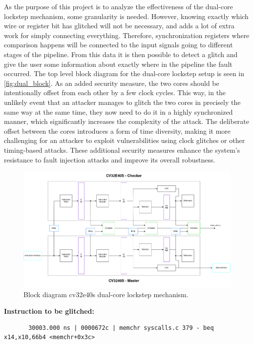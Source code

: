 As the purpose of this project is to analyze the effectiveness of the dual-core lockstep mechanism, some granularity is needed. However, knowing exactly which wire or register bit has glitched will not be necessary, and adds a lot of extra work for simply connecting everything. Therefore, synchronization registers where comparison happens will be connected to the input signals going to different stages of the pipeline. From this data it is then possible to detect a glitch and give the user some information about exactly where in the pipeline the fault occurred. The top level block diagram for the dual-core lockstep setup is seen in \autoref{fig:dual_block}. As an added security measure, the two cores should be intentionally offset from each other by a few clock cycles. This way, in the unlikely event that an attacker manages to glitch the two cores in precisely the same way at the same time, they now need to do it in a highly synchronized manner, which significantly increases the complexity of the attack. The deliberate offset between the cores introduces a form of time diversity, making it more challenging for an attacker to exploit vulnerabilities using clock glitches or other timing-based attacks. These additional security measures enhance the system's resistance to fault injection attacks and improve its overall robustness.

\begin{figure}[h!]
    \centering
    \includegraphics[width=\textwidth]{docs/images/dual_cores_block.png}
    \caption{Block diagram cv32e40s dual-core lockstep mechanism.}
    \label{fig:dual_block}
\end{figure}

\textbf{Instruction to be glitched:}
\begin{lstlisting}
       30003.000 ns | 0000672c | memchr syscalls.c 379 - beq x14,x10,66b4 <memchr+0x3c>
\end{lstlisting}

